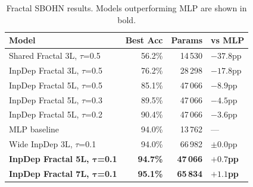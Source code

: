 \begin{table}[h]
\centering
\caption{Fractal SBOHN results. Models outperforming MLP are shown in bold.}
\label{tab:fractal_results}
\begin{tabular}{lrrl}
\hline
\textbf{Model} & \textbf{Best Acc} & \textbf{Params} & \textbf{vs MLP} \\
\hline
Shared Fractal 3L, $\tau$=0.5    & 56.2\% & 14\,530 & $-37.8$pp \\
InpDep Fractal 3L, $\tau$=0.5    & 76.2\% & 28\,298 & $-17.8$pp \\
InpDep Fractal 5L, $\tau$=0.5    & 85.1\% & 47\,066 & $-8.9$pp \\
InpDep Fractal 5L, $\tau$=0.3    & 89.5\% & 47\,066 & $-4.5$pp \\
InpDep Fractal 5L, $\tau$=0.2    & 90.4\% & 47\,066 & $-3.6$pp \\
MLP baseline                     & 94.0\% & 13\,762 & --- \\
Wide InpDep 3L, $\tau$=0.1       & 94.0\% & 66\,982 & $\pm 0.0$pp \\
\textbf{InpDep Fractal 5L, $\boldsymbol{\tau}$=0.1} & \textbf{94.7\%} & \textbf{47\,066} & $\boldsymbol{+0.7}$\textbf{pp} \\
\textbf{InpDep Fractal 7L, $\boldsymbol{\tau}$=0.1} & \textbf{95.1\%} & \textbf{65\,834} & $\boldsymbol{+1.1}$\textbf{pp} \\
\hline
\end{tabular}
\end{table}
